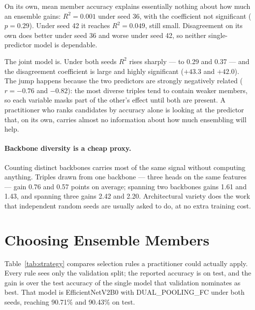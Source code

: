\documentclass[runningheads]{llncs}
\begin{document}
On its own, mean member accuracy explains essentially nothing about how much an
ensemble gains: $R^2 = 0.001$ under seed 36, with the coefficient not
significant ($p = 0.29$). Under seed 42 it reaches $R^2 = 0.049$, still small.
Disagreement on its own does better under seed 36 and worse under seed 42, so
neither single-predictor model is dependable.

The joint model is. Under both seeds $R^2$ rises sharply --- to 0.29 and 0.37
--- and the disagreement coefficient is large and highly significant
($+43.3$ and $+42.0$). The jump happens because the two predictors are strongly
negatively related ($r = -0.76$ and $-0.82$): the most diverse triples tend to contain weaker members, so
each variable masks part of the other's effect until both are present. A
practitioner who ranks candidates by accuracy alone is looking at the predictor
that, on its own, carries almost no information about how much ensembling will
help.

\paragraph{Backbone diversity is a cheap proxy.}
Counting distinct backbones carries most of the same signal without computing
anything. Triples drawn from one backbone --- three heads on the same features
--- gain 0.76 and 0.57 points on average; spanning two backbones gains 1.61 and
1.43, and spanning three gains 2.42 and 2.20. Architectural variety does the
work that independent random seeds are usually asked to do, at no extra
training cost.

\section{Choosing Ensemble Members}
\label{sec:select}

Table~\ref{tab:strategy} compares selection rules a practitioner could actually
apply. Every rule sees only the validation split; the reported accuracy is on
test, and the gain is over the test accuracy of the single model that
validation nominates as best. That model is EfficientNetV2B0 with
DUAL\_POOLING\_FC under both seeds, reaching 90.71\% and 90.43\% on test.
\end{document}
